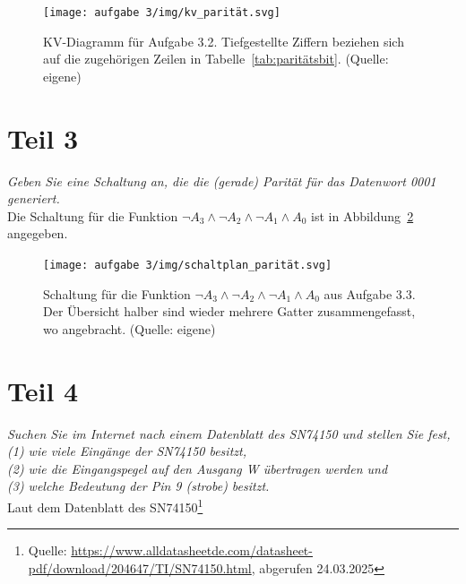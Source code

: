 \begin{figure}
    \centering
    \texttt{[image: aufgabe 3/img/kv\_parität.svg]}
    \caption{KV-Diagramm für Aufgabe 3.2. Tiefgestellte Ziffern beziehen sich auf die zugehörigen Zeilen in Tabelle~\ref{tab:paritätsbit}.  (Quelle: eigene)}
    \label{fig:kv_parität}
\end{figure}

\section{Teil 3}

\textit{Geben Sie eine Schaltung an, die die (gerade) Parität für das Datenwort  0001 generiert.}\\

\noindent
Die Schaltung für die Funktion $\neg A_3 \land \neg A_2 \land \neg A_1 \land A_0$ ist in Abbildung~\ref{fig:schaltplan_parität} angegeben.

\begin{figure}
    \centering
    \texttt{[image: aufgabe 3/img/schaltplan\_parität.svg]}
    \caption{Schaltung für die Funktion $\neg A_3 \land \neg A_2 \land \neg A_1 \land A_0$ aus Aufgabe 3.3. Der Übersicht halber sind wieder mehrere Gatter zusammengefasst, wo angebracht. (Quelle: eigene)}
    \label{fig:schaltplan_parität}
\end{figure}

\section{Teil 4}

\textit{Suchen Sie im Internet nach einem Datenblatt des SN74150 und stellen
Sie fest,\\
    (1) wie viele Eingänge der SN74150 besitzt,\\
    (2) wie die Eingangspegel auf den Ausgang W übertragen werden und\\
    (3) welche Bedeutung der Pin 9 (strobe) besitzt.
}\\

\noindent
Laut dem Datenblatt des SN74150\footnote{
Quelle: \url{https://www.alldatasheetde.com/datasheet-pdf/download/204647/TI/SN74150.html}, abgerufen 24.03.2025
}

